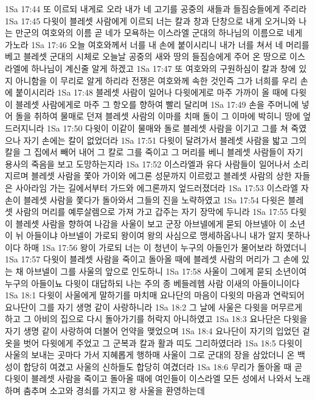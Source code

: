 1Sa 17:44  또 이르되 내게로 오라 내가 네 고기를 공중의 새들과 들짐승들에게 주리라
1Sa 17:45  다윗이 블레셋 사람에게 이르되 너는 칼과 창과 단창으로 내게 오거니와 나는 만군의 여호와의 이름 곧 네가 모욕하는 이스라엘 군대의 하나님의 이름으로 네게 가노라
1Sa 17:46  오늘 여호와께서 너를 내 손에 붙이시리니 내가 너를 쳐서 네 머리를 베고 블레셋 군대의 시체로 오늘날 공중의 새와 땅의 들짐승에게 주어 온 땅으로 이스라엘에 하나님이 계신줄 알게 하겠고
1Sa 17:47  또 여호와의 구원하심이 칼과 창에 있지 아니함을 이 무리로 알게 하리라 전쟁은 여호와께 속한 것인즉 그가 너희를 우리 손에 붙이시리라
1Sa 17:48  블레셋 사람이 일어나 다윗에게로 마주 가까이 올 때에 다윗이 블레셋 사람에게로 마주 그 항오를 향하여 빨리 달리며
1Sa 17:49  손을 주머니에 넣어 돌을 취하여 물매로 던져 블레셋 사람의 이마를 치매 돌이 그 이마에 박히니 땅에 엎드러지니라
1Sa 17:50  다윗이 이같이 물매와 돌로 블레셋 사람을 이기고 그를 쳐 죽였으나 자기 손에는 칼이 없었더라
1Sa 17:51  다윗이 달려가서 블레셋 사람을 밟고 그의 칼을 그 집에서 빼어 내어 그 칼로 그를 죽이고 그 머리를 베니 블레셋 사람들이 자기 용사의 죽음을 보고 도망하는지라
1Sa 17:52  이스라엘과 유다 사람들이 일어나서 소리지르며 블레셋 사람을 쫓아 가이와 에그론 성문까지 이르렀고 블레셋 사람의 상한 자들은 사아라임 가는 길에서부터 가드와 에그론까지 엎드러졌더라
1Sa 17:53  이스라엘 자손이 블레셋 사람을 쫓다가 돌아와서 그들의 진을 노략하였고
1Sa 17:54  다윗은 블레셋 사람의 머리를 예루살렘으로 가져 가고 갑주는 자기 장막에 두니라
1Sa 17:55  다윗이 블레셋 사람을 향하여 나감을 사울이 보고 군장 아브넬에게 묻되 아브넬아 이 소년이 뉘 아들이냐 아브넬이 가로되 왕이여 왕의 사심으로 맹세하옵나니 내가 알지 못하나이다 하매
1Sa 17:56  왕이 가로되 너는 이 청년이 누구의 아들인가 물어보라 하였더니
1Sa 17:57  다윗이 블레셋 사람을 죽이고 돌아올 때에 블레셋 사람의 머리가 그 손에 있는 채 아브넬이 그를 사울의 앞으로 인도하니
1Sa 17:58  사울이 그에게 묻되 소년이여 누구의 아들이뇨 다윗이 대답하되 나는 주의 종 베들레헴 사람 이새의 아들이니이다
1Sa 18:1  다윗이 사울에게 말하기를 마치매 요나단의 마음이 다윗의 마음과 연락되어 요나단이 그를 자기 생명 같이 사랑하니라
1Sa 18:2  그 날에 사울은 다윗을 머무르게 하고 그 아비의 집으로 다시 돌아가기를 허락지 아니하였고
1Sa 18:3  요나단은 다윗을 자기 생명 같이 사랑하여 더불어 언약을 맺었으며
1Sa 18:4  요나단이 자기의 입었던 겉옷을 벗어 다윗에게 주었고 그 군복과 칼과 활과 띠도 그리하였더라
1Sa 18:5  다윗이 사울의 보내는 곳마다 가서 지혜롭게 행하매 사울이 그로 군대의 장을 삼았더니 온 백성이 합당히 여겼고 사울의 신하들도 합당히 여겼더라
1Sa 18:6  무리가 돌아올 때 곧 다윗이 블레셋 사람을 죽이고 돌아올 때에 여인들이 이스라엘 모든 성에서 나와서 노래하며 춤추며 소고와 경쇠를 가지고 왕 사울을 환영하는데
